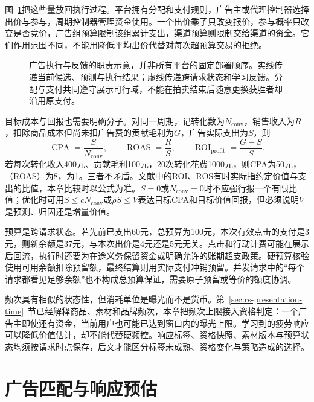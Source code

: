 图~\ref{fig:rs-advertising-loop}把这些量放回执行过程。平台拥有分配和支付规则，广告主或代理控制器选择出价与参与，周期控制器管理资金使用。一个出价乘子只改变报价，参与概率只改变是否竞价，广告组预算限制该组累计支出，渠道预算则限制交给渠道的资金。它们作用范围不同，不能用降低平均出价代替对每次超预算交易的拒绝。

\begin{figure}[htbp]
  \centering
  
  \caption{广告执行与反馈的职责示意，并非所有平台的固定部署顺序。实线传递当前候选、预测与执行结果；虚线传递跨请求状态和学习反馈。分配与支付共同遵守展示可行域，不能在拍卖结束后随意更换获胜者却沿用原支付。}
  \label{fig:rs-advertising-loop}
\end{figure}

目标成本与回报也需要明确分子。对同一周期，记转化数为$N_{\mathrm{conv}}$，销售收入为$R$，扣除商品成本但尚未扣广告费的贡献毛利为$G$，广告实际支出为$S$，则
\begin{equation}
  \operatorname{CPA}=\frac{S}{N_{\mathrm{conv}}},\qquad
  \operatorname{ROAS}=\frac{R}{S},\qquad
  \operatorname{ROI}_{\mathrm{profit}}=\frac{G-S}{S}.
  \label{eq:rs-advertising-returns}
\end{equation}
若每次转化收入400元、贡献毛利100元，20次转化花费1000元，则CPA为50元，（ROAS）为8，为1。三者不矛盾。文献中的ROI、ROS有时实际指约定价值与支出的比值，本章比较时以公式为准。$S=0$或$N_{\mathrm{conv}}=0$时不应强行报一个有限比值；优化时可用$S\leq cN_{\mathrm{conv}}$或$\rho S\leq V$表达目标CPA和目标价值回报，但必须说明$V$是预测、归因还是增量价值。

预算是跨请求状态。若先前已支出60元，总预算为100元，本次有效点击的支付是3元，则新余额是37元，与本次出价是4元还是5元无关。点击和行动计费可能在展示后回流，执行时还要为在途义务保留资金或明确允许的账期超支政策。硬预算核验使用可用余额扣除预留额，最终结算则用实际支付冲销预留。并发请求中的“每个请求都看见足够余额”也不构成总预算保证，需要原子预留或等价的额度协调。

频次具有相似的状态性，但消耗单位是曝光而不是货币。第~\ref{sec:rs-presentation-time}~节已经解释商品、素材和品牌频次，本章把频次上限接入资格判定：一个广告主即使还有资金，当前用户也可能已达到窗口内的曝光上限。学习到的疲劳响应可以降低价值估计，却不能代替硬频控。响应标签、资格快照、素材版本与预算状态均须按请求时点保存，后文才能区分标签未成熟、资格变化与策略造成的选择。

\section{广告匹配与响应预估}
\label{sec:rs-advertising-matching}

